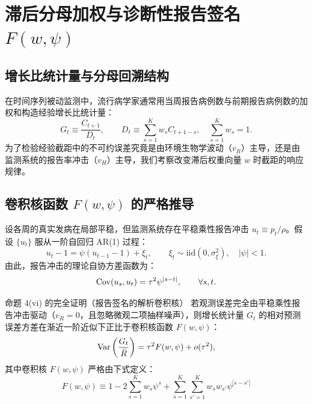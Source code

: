 \section{滞后分母加权与诊断性报告签名 $F(w, \psi)$}
\label{sec:part08}

\subsection{增长比统计量与分母回溯结构}

在时间序列被动监测中，流行病学家通常用当周报告病例数与前期报告病例数的加权和构造经验增长比统计量：
\begin{equation}
  G_t \equiv \frac{C_{t+1}}{D_t}, \qquad D_t \equiv \sum_{s=1}^K w_s C_{t+1-s}, \quad \sum_{s=1}^K w_s = 1.
  \label{eq:Gt-def}
\end{equation}
为了检验经验截距中的不可约误差究竟是由环境生物学波动（$v_R$）主导，还是由监测系统的报告率冲击（$v_H$）主导，我们考察改变滞后权重向量 $w$ 时截距的响应规律。

\subsection{卷积核函数 $F(w, \psi)$ 的严格推导}

设各周的真实发病在局部平稳，但监测系统存在平稳乘性报告冲击 $u_t \equiv p_t/\rho$。假设 $\{u_t\}$ 服从一阶自回归 AR(1) 过程：
\begin{equation}
  u_t - 1 = \psi (u_{t-1} - 1) + \xi_t, \qquad \xi_t \sim \text{iid}(0, \sigma_\xi^2), \quad |\psi| < 1.
\end{equation}
由此，报告冲击的理论自协方差函数为：
\begin{equation}
  \mathrm{Cov}(u_s, u_t) = \tau^2 \psi^{|s - t|}, \qquad \forall s, t.
\end{equation}

\begin{theorembox}{命题 4(vi) 的完全证明（报告签名的解析卷积核）}
若观测误差完全由平稳乘性报告冲击驱动（$v_R = 0$，且忽略微观二项抽样噪声），则增长统计量 $G_t$ 的相对预测误差方差在渐近一阶近似下正比于卷积核函数 $F(w, \psi)$：
\begin{equation}
  \mathrm{Var}\left( \frac{G_t}{\bar{R}} \right) = \tau^2 F(w, \psi) + o(\tau^2),
  \label{eq:var-Gt-F}
\end{equation}
其中卷积核 $F(w, \psi)$ 严格由下式定义：
\begin{equation}
  \boxed{\, F(w, \psi) \equiv 1 - 2\sum_{s=1}^K w_s \psi^s + \sum_{s=1}^K \sum_{s'=1}^K w_s w_{s'} \psi^{|s - s'|} \,}
  \label{eq:Fw-kernel-proof}
\end{equation}
\end{theorembox}

